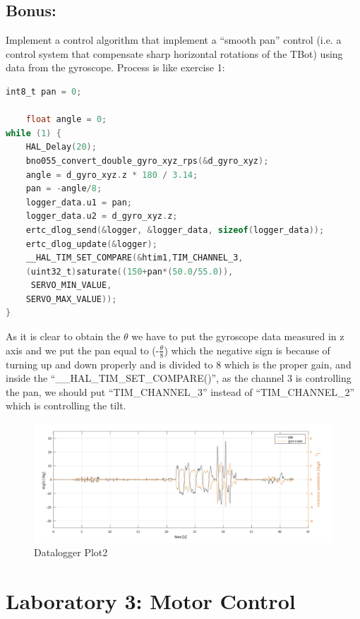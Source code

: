 \documentclass[english]{article}
\begin{document}
\subsection{Bonus:}
Implement a control algorithm that implement a “smooth pan” control
(i.e. a control system that compensate sharp horizontal rotations of the TBot) 
using data from the gyroscope.\newline
Process is like exercise 1:
\newpage
\begin{lstlisting}[language=C, caption={}, label={lst:datalog} ]
    int8_t pan = 0; 

    float angle = 0; 
while (1) { 
    HAL_Delay(20); 
    bno055_convert_double_gyro_xyz_rps(&d_gyro_xyz);
    angle = d_gyro_xyz.z * 180 / 3.14;
    pan = -angle/8;
    logger_data.u1 = pan; 
    logger_data.u2 = d_gyro_xyz.z; 
    ertc_dlog_send(&logger, &logger_data, sizeof(logger_data)); 
    ertc_dlog_update(&logger); 
    __HAL_TIM_SET_COMPARE(&htim1,TIM_CHANNEL_3,
    (uint32_t)saturate((150+pan*(50.0/55.0)),
     SERVO_MIN_VALUE,
    SERVO_MAX_VALUE));   
} 
\end{lstlisting}
As it is clear to obtain the $\theta$ we have to put the gyroscope data measured in z axis and we put the pan equal to
(-$\frac{\theta}{8}$) which the negative sign is because of turning up and down
 properly and is divided to 8 which is the proper gain, and inside the “\_\_HAL\_TIM\_SET\_COMPARE()”, as the channel 3 is controlling the pan, 
 we should put “TIM\_CHANNEL\_3” instead of “TIM\_CHANNEL\_2” which is controlling the tilt. 
 \begin{figure}[!h]
    \centering
    \includegraphics[width=1.0\textwidth, height=0.35\textheight]{figures/plot2.png}
    \caption{Datalogger Plot2}
    \label{fig:datal2}
\end{figure}
\newpage
\section{Laboratory 3: Motor Control}
\end{document}
